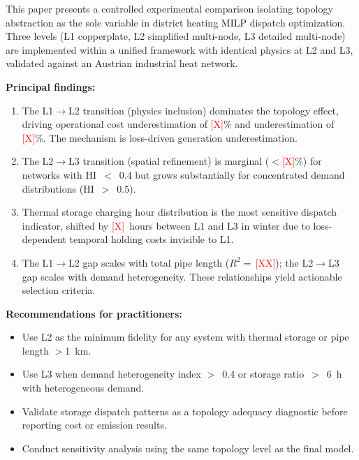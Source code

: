 \documentclass[review,3p]{elsarticle}
\newcommand{\placeholder}[1]{\textcolor{red}{[#1]}}
\begin{document}
This paper presents a controlled experimental comparison isolating
topology abstraction as the sole variable in district heating MILP
dispatch optimization. Three levels (L1 copperplate, L2 simplified
multi-node, L3 detailed multi-node) are implemented within a unified
framework with identical physics at L2 and L3, validated against an
Austrian industrial heat network.

\textbf{Principal findings:}
\begin{enumerate}
    \item The L1$\rightarrow$L2 transition (physics inclusion) dominates
    the topology effect, driving operational cost underestimation of
    \placeholder{X}\% and  underestimation of \placeholder{X}\%.
    The mechanism is loss-driven generation underestimation.

    \item The L2$\rightarrow$L3 transition (spatial refinement) is
    marginal ($<$\placeholder{X}\%) for networks with HI~$<$~0.4 but
    grows substantially for concentrated demand distributions
    (HI~$>$~0.5).

    \item Thermal storage charging hour distribution is the most
    sensitive dispatch indicator, shifted by \placeholder{X}~hours
    between L1 and L3 in winter due to loss-dependent temporal holding
    costs invisible to L1.

    \item The L1$\rightarrow$L2 gap scales with total pipe length
    ($R^2\!=\,$\placeholder{XX}); the L2$\rightarrow$L3 gap scales
    with demand heterogeneity. These relationships yield actionable
    selection criteria.
\end{enumerate}

\textbf{Recommendations for practitioners:}
\begin{itemize}
    \item Use L2 as the minimum fidelity for any system with thermal
    storage or pipe length $>$1~km.
    \item Use L3 when demand heterogeneity index $>$~0.4 or storage
    ratio~$>$~6~h with heterogeneous demand.
    \item Validate storage dispatch patterns as a topology adequacy
    diagnostic before reporting cost or emission results.
    \item Conduct sensitivity analysis using the same topology level
    as the final model.
\end{itemize}
\end{document}
